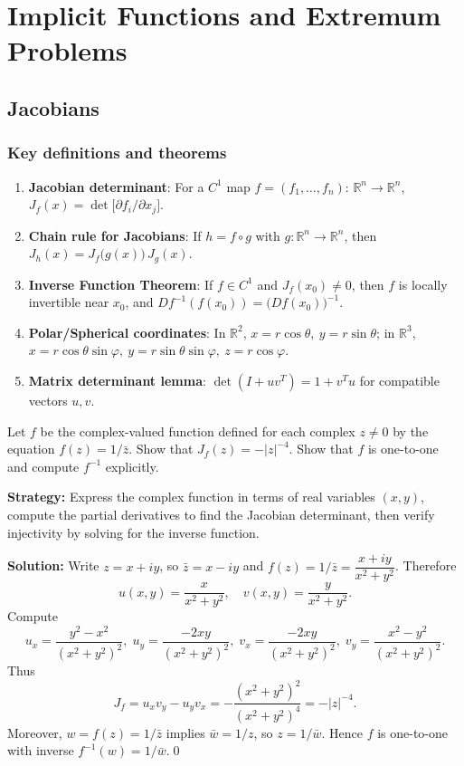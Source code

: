 \chapter{Implicit Functions and Extremum Problems}

\section{Jacobians}
\subsection*{Key definitions and theorems}
\begin{enumerate}[label=(\roman*)]
    \item \textbf{Jacobian determinant}: For a $C^1$ map $f=(f_1,\dots,f_n):\,\mathbb R^n\to\mathbb R^n$, $J_f(x)=\det\big[\partial f_i/\partial x_j\big]$.
    \item \textbf{Chain rule for Jacobians}: If $h=f\circ g$ with $g: \mathbb R^n\to\mathbb R^n$, then $J_h(x)=J_f\big(g(x)\big)\,J_g(x)$.
    \item \textbf{Inverse Function Theorem}: If $f\in C^1$ and $J_f(x_0)\neq 0$, then $f$ is locally invertible near $x_0$, and $D f^{-1}(f(x_0))=\big(D f(x_0)\big)^{-1}$.
    \item \textbf{Polar/Spherical coordinates}: In $\mathbb R^2$, $x=r\cos\theta,\ y=r\sin\theta$; in $\mathbb R^3$, $x=r\cos\theta\sin\varphi,\ y=r\sin\theta\sin\varphi,\ z=r\cos\varphi$.
    \item \textbf{Matrix determinant lemma}: $\det(I+uv^{\!T})=1+v^{\!T}u$ for compatible vectors $u,v$.
\end{enumerate}


\begin{problembox}
Let \( f \) be the complex-valued function defined for each complex \( z \neq 0 \) by the equation \( f(z) = 1/\bar{z} \). Show that \( J_f(z) = -|z|^{-4} \). Show that \( f \) is one-to-one and compute \( f^{-1} \) explicitly.
\end{problembox}

\noindent\textbf{Strategy:} Express the complex function in terms of real variables $(x,y)$, compute the partial derivatives to find the Jacobian determinant, then verify injectivity by solving for the inverse function.

\bigskip\noindent\textbf{Solution:}
Write $z=x+iy$, so $\bar z=x-iy$ and $f(z)=1/\bar z=\dfrac{x+iy}{x^2+y^2}$. Therefore
\[u(x,y)=\frac{x}{x^2+y^2},\quad v(x,y)=\frac{y}{x^2+y^2}.
\]
Compute
\[u_x=\frac{y^2-x^2}{(x^2+y^2)^2},\; u_y=\frac{-2xy}{(x^2+y^2)^2},\; v_x=\frac{-2xy}{(x^2+y^2)^2},\; v_y=\frac{x^2-y^2}{(x^2+y^2)^2}.
\]
Thus
\[J_f=u_xv_y-u_yv_x=-\frac{(x^2+y^2)^2}{(x^2+y^2)^4}=-|z|^{-4}.
\]
Moreover, $w=f(z)=1/\bar z$ implies $\bar w=1/z$, so $z=1/\bar w$. Hence $f$ is one-to-one with inverse $f^{-1}(w)=1/\bar w$.\qed


